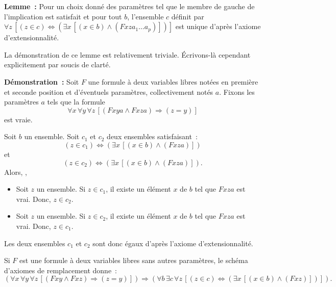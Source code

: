 \noindent\textbf{Lemme :} Pour un choix donné des paramètres tel que le membre de gauche de l'implication est satisfait et pour tout $b$, l'ensemble $c$ définit par $\forall z \, \left[ (z \in c) \Leftrightarrow (\exists x \, [(x \in b) \wedge (F x z a_1 \dots a_p)]) \right]$ est unique d'après l'axiome d'extensionnalité.

\medskip

La démonstration de ce lemme est relativement triviale. 
Écrivons-là cependant explicitement par soucis de clarté. 

\medskip

\noindent\textbf{Démonstration :} 
    Soit $F$ une formule à deux variables libres notées en première et seconde position et d'éventuels paramètres, collectivement notés $a$. 
    Fixons les paramètres $a$ tels que la formule
    \begin{equation*}
        \forall x \, \forall y \, \forall z \, \left[
            (F x y a \wedge F x z a) \Rightarrow (z = y)
        \right]
    \end{equation*}
    est vraie. 
    
    Soit $b$ un ensemble. 
    Soit $c_1$ et $c_2$ deux ensembles satisfaisant : 
    \begin{equation*}
        (z \in c_1) \Leftrightarrow (\exists x \, [(x \in b) \wedge (F x z a)])
    \end{equation*}
    et 
    \begin{equation*}
        (z \in c_2) \Leftrightarrow (\exists x \, [(x \in b) \wedge (F x z a)]) .
    \end{equation*}
    Alors, ,
    \begin{itemize}[nosep]
        \item Soit $z$ un ensemble. 
            Si $z \in c_1$, il existe un élément $x$ de $b$ tel que $F x z a$ est vrai. 
            Donc, $z \in c_2$.
        \item Soit $z$ un ensemble. 
            Si $z \in c_2$, il existe un élément $x$ de $b$ tel que $F x z a$ est vrai. 
            Donc, $z \in c_1$.
    \end{itemize}
    Les deux ensembles $c_1$ et $c_2$ sont donc égaux d'après l'axiome d'extensionnalité.

   \done 

\medskip

Si $F$ est une formule à deux variables libres sans autres paramètres, le schéma d'axiomes de remplacement donne :
\begin{equation*}
    \left( 
        \forall x \, \forall y \, \forall z \, \left[
            (F x y \wedge F x z) \Rightarrow (z = y)
        \right]
    \right)
    \Rightarrow
    \left(
        \forall b \, \exists c \, \forall z \, \left[
            (z \in c) \Leftrightarrow (\exists x \, [(x \in b) \wedge (F x z)])
        \right]
    \right)
.
\end{equation*}


